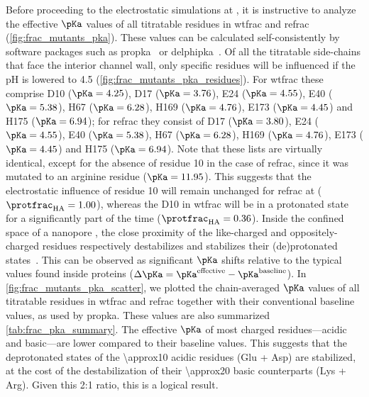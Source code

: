 Before proceeding to the electrostatic simulations at , it is instructive to analyze the
effective $\pKa$ values of all titratable residues in \gls{wtfrac} and \gls{refrac}
(\cref{fig:frac_mutants_pka}). These values can be calculated self-consistently by software packages such as
\gls{propka}~\cite{Olsson-2011,Sondergaard-2011} or \gls{delphipka}~\cite{Wang-2015}. Of all the titratable
side-chains that face the interior channel wall, only specific residues will be influenced if the pH is
lowered to \num{4.5} (\cref{fig:frac_mutants_pka_residues}). For \gls{wtfrac} these comprise D10 ($\pKa =
4.25$), D17 ($\pKa = 3.76$), E24 ($\pKa = 4.55$), E40 ($\pKa = 5.38$), H67 ($\pKa = 6.28$), H169 ($\pKa =
4.76$), E173 ($\pKa = 4.45$) and H175 ($\pKa = 6.94$); for \gls{refrac} they consist of D17 ($\pKa = 3.80$),
E24 ($\pKa = 4.55$), E40 ($\pKa = 5.38$), H67 ($\pKa = 6.28$), H169 ($\pKa = 4.76$), E173 ($\pKa = 4.45$) and
H175 ($\pKa = 6.94$). Note that these lists are virtually identical, except for the absence of residue 10 in
the case of \gls{refrac}, since it was mutated to an arginine residue ($\pKa = 11.95$). This suggests that the
electrostatic influence of residue 10 will remain unchanged for \gls{refrac} at 
($\protfrac_{\mathrm{HA}} = 1.00$), whereas the D10 in \gls{wtfrac} will be in a protonated state for a
significantly part of the time ($\protfrac_{\mathrm{HA}} = 0.36$). Inside the confined space of a nanopore
\lumen{}, the close proximity of the like-charged and oppositely-charged residues respectively destabilizes
and stabilizes their (de)protonated states~\cite{Olsson-2011}. This can be observed as significant $\pKa$
shifts relative to the typical values found inside proteins ($\Delta \pKa = \pKa^{\textrm{effective}} -
\pKa^{\textrm{baseline}}$). In \cref{fig:frac_mutants_pka_scatter}, we plotted the chain-averaged $\pKa$
values of all titratable residues in \gls{wtfrac} and \gls{refrac} together with their conventional baseline
values, as used by \gls{propka}. These values are also summarized \cref{tab:frac_pka_summary}. The effective
$\pKa$ of most charged residues---acidic and basic---are lower compared to their baseline values. This
suggests that the deprotonated states of the \num{\approx10} acidic residues (Glu + Asp) are stabilized, at
the cost of the destabilization of their \num{\approx20} basic counterparts (Lys + Arg). Given this 2:1 ratio,
this is a logical result.

